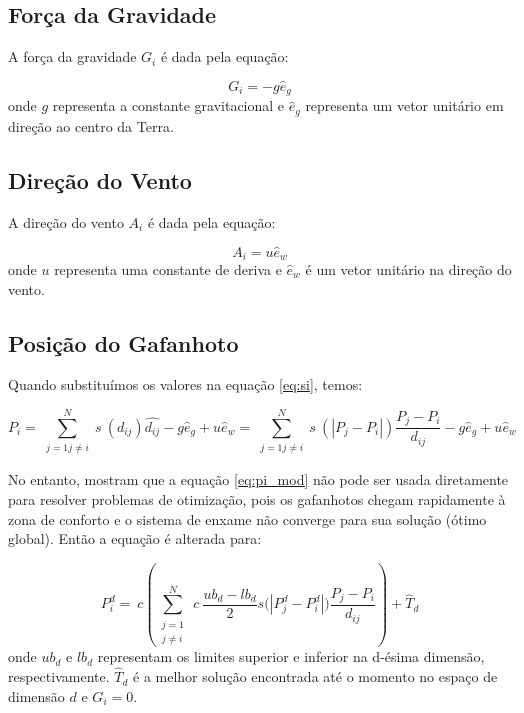 \subsection{Força da Gravidade}
\label{subsubsec:forca_gravidade}

A força da gravidade $G_i$ é dada pela equação:

\begin{equation}
  \label{eq:gi}
  G_i = -g \hat{e}_g
\end{equation}
onde $g$ representa a constante gravitacional e $\hat{e}_g $ representa um vetor unitário em direção ao centro da Terra.


\subsection{Direção do Vento}
\label{subsubsec:direcao_vento}

A direção do vento $A_i$ é dada pela equação:

\begin{equation}
  \label{eq:ai}
  A_i = u \hat{e}_w
\end{equation}
onde $u$ representa uma constante de deriva e $\hat{e}_w$ é um vetor unitário na direção do vento.
\subsection{Posição do Gafanhoto}
\label{subsubsec:posicao_gafanhoto}


Quando substituímos os valores na equação \ref{eq:si}, temos:

\begin{equation}
  {P_i} = \sum_{\substack{j=1 j \neq i}}^{N} s~(d_{ij})\widehat{d_{ij}} - g\hat{e}_g + u\hat{e}_w = \sum_{\substack{j=1 j \neq i}}^{N} s~(|P_j-P_i|) \frac{P_j-P_i}{d_{ij}}- g\hat{e}_g + u\hat{e}_w
  \label{eq:pi_mod}
\end{equation}

No entanto,  mostram que a equação \ref{eq:pi_mod} não pode ser usada diretamente para resolver problemas de otimização, pois os gafanhotos chegam rapidamente à zona de conforto e o sistema de enxame não converge para sua solução (ótimo global). Então a equação é alterada para:

\begin{equation}
  \label{eq:pid}
  P_i^d = ~c\left (\sum_{\substack{j=1 \\j \neq i}}^{N} ~c~\frac{ub_d-lb_d}{2} s\big (|P_j^d-P_i^d| \big ) \frac{P_j-P_i}{d_{ij}}\right ) + \widehat{T}_d
\end{equation}
onde $ub_d$ e $lb_d$ representam os limites superior e inferior na d-ésima dimensão, respectivamente. $\hat{T}_d$ é a melhor solução encontrada até o momento no espaço de dimensão $d$ e $G_i = 0$.

